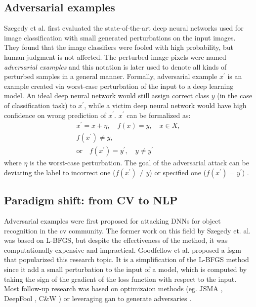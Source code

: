 \subsection{Adversarial examples}\label{subsec:adversarial-attacks}

Szegedy et al. \cite{szegedy2013intriguing} first evaluated the state-of-the-art deep neural networks used for image classification with small generated perturbations on the input images.
They found that the image classifiers were fooled with high probability, but human judgment is not affected. The perturbed image pixels were named \emph{adversarial examples} and this notation is later used to denote all kinds of perturbed samples in a general manner.
Formally, adversarial example $x^\prime$ is an example created via worst-case perturbation of the input to a deep learning model. An ideal deep neural network would still assign correct class $y$ (in the case of classification task) to $x^\prime$, 
while a victim deep neural network would have high confidence on wrong prediction of $x^\prime$. $x^\prime$ can be formalized as:
\begin{equation}
    \begin{array}{l}
    x^\prime = x + \eta, \quad f(x)=y, \quad x \in X,\\
    f(x^\prime) \neq y, \\
    \text{or} \quad f(x^\prime) = y^\prime, \quad y \neq y^\prime
    \end{array}
\end{equation}
where $\eta$ is the worst-case perturbation. The goal of the adversarial attack can be deviating the label to incorrect one ($f(x^\prime) \neq y$) or specified one ($f(x^\prime) = y^\prime$) \cite{journals/tist/ZhangSAL20}.

\subsection[Paradigm shift]{Paradigm shift: from CV to NLP}\label{subsec:paradigm-shift}
Adversarial examples were first proposed for attacking DNNs for object recognition in the \acrfull{cv} community.
The former work on this field by Szegedy et. al. \cite{szegedy2013intriguing}  was based on L-BFGS, but despite the effectiveness of the method, it was computationally expensive and impractical.
Goodfellow et al. \cite{goodfellow2014explaining} proposed a \acrfull{fsgm} that popularized this research topic. It is a simplification of the L-BFGS method since it add a small perturbation to the input of a model, which is computed by taking the sign of the gradient of the loss function with respect to the input.
Most follow-up research was based on optimizaion methods (eg. JSMA \cite{journals/corr/PapernotMJFCS15}, DeepFool \cite{journals/corr/Moosavi-Dezfooli15}, C\&W \cite{journals/corr/CarliniW16a}) or leveraging \acrfull{gan} to generate adversaries \cite{journals/corr/abs-1710-11342}.

